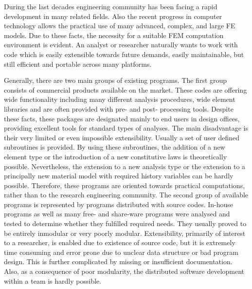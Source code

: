 \documentclass[a4paper]{article}
\begin{document}
During the last decades engineering community has been facing a rapid
development in many related fields. Also the recent progress in
computer technology allows the practical use of many advanced, complex, and large FE models. 
Due to these facts, the necessity for a suitable FEM computation
environment is evident. An analyst or researcher naturally wants to
work with code which is easily extensible towards future demands, easily maintainable, but still efficient and portable across many platforms. 

Generally, there are two main groups of  existing programs. 
The first group consists of commercial products available on the market. These codes
are offering wide functionality including many different analysis procedures,
wide element libraries and are often provided with pre- and post-
processing tools. Despite these facts, these packages are designated
mainly to end users in design offices, providing excellent
tools for standard types of analyses. The main disadvantage is their
very limited or even impossible extensibility. Usually a set of user
defined subroutines is provided. By using these subroutines, the addition
of a new element type or the introduction of a new constitutive
laws is theoretically possible. Nevertheless, the extension to a new analysis
type or the extension to a principally new material model with required
history variables can be hardly possible. Therefore, these programs
are oriented towards practical computations, rather than to the
research engineering community.  
The second group of available programs is represented by programs
distributed with source codes. In-house programs as well as many free-
and share-ware programs were analysed and tested to determine whether they fulfilled
required needs. 
They usually proved to be entirely inmodular or very poorly
modular. Extensibility, primarily of interest to a researcher, is enabled
due to existence of source code, but it is extremely time consuming
and error prone due to unclear data structure or bad program
design. This is further complicated by missing or insufficient
documentation. 
Also, as a consequence of poor modularity, the distributed software
development within a team is hardly possible.
\end{document}
